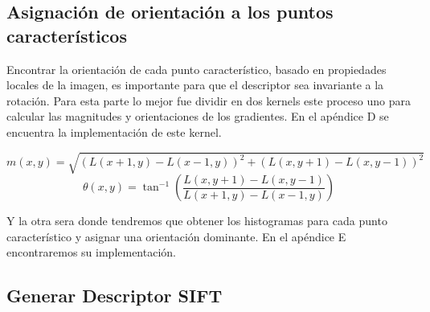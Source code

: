 \subsection{Asignación de orientación a los puntos característicos}

Encontrar la orientación de cada punto característico, basado en propiedades locales de la imagen, es importante para que el descriptor sea invariante a la rotación.
Para esta parte lo mejor fue dividir en dos kernels este proceso uno para calcular las magnitudes y orientaciones de los gradientes. En el apéndice D se encuentra la implementación de este kernel.

$$m(x,y) = \sqrt{ (L(x+1,y)-L(x-1,y))^2 + (L(x,y+1)-L(x,y-1))^2 }$$		
$$\theta(x,y) =  \tan^{-1} \left(\frac{L(x,y+1)-L(x,y-1)}{L(x+1,y)-L(x-1,y)}\right)$$

Y la otra sera donde tendremos que obtener los histogramas para cada punto característico y asignar una orientación dominante. En el apéndice E encontraremos su implementación. 
































\subsection{Generar Descriptor SIFT}
